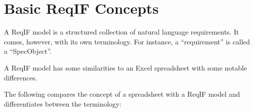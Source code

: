 % 

\section{Basic ReqIF Concepts}

A ReqIF model is a structured collection of natural language requirements.  It comes, however, with its own terminology.  For instance, a ``requirement'' is called a ``SpecObject''.

A ReqIF model has some similarities to an Excel spreadsheet with some notable differences.

The following compares the concept of a spreadsheet with a ReqIF model and differentiates between the terminology:

